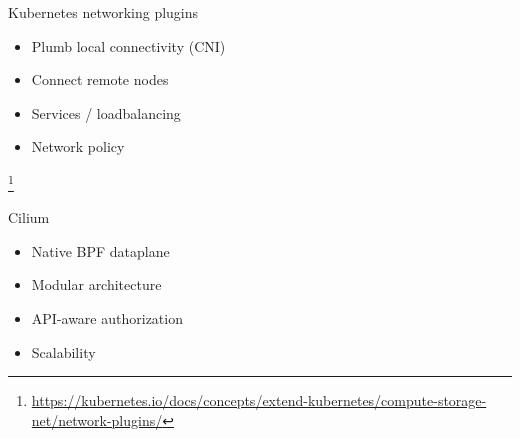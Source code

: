\documentclass[black,white]{beamer}
\newcommand\blfootnote[1]{%
  \begingroup
  \renewcommand\thefootnote{}\footnote{#1}%
  \addtocounter{footnote}{-1}%
  \endgroup
}
\DeclareRobustCommand{\#}{\adjustbox{valign=B,totalheight=.57\baselineskip}{\oldhash}}%
\begin{document}
    \begin{frame}{Kubernetes networking plugins}
        \begin{table}
            \begin{subtable}[l]{0.6\textwidth}
                \begin{itemize}
                    \item Plumb local connectivity (CNI) \medskip
                    \item Connect remote nodes \medskip
                    \item Services / loadbalancing \medskip
                    \item Network policy \medskip
                \end{itemize}
            \end{subtable}
            \begin{subtable}[r]{0.35\textwidth}
                \begin{figure}
                    
                \end{figure}
            \end{subtable}
        \end{table}
        \blfootnote{{\tiny \url{https://kubernetes.io/docs/concepts/extend-kubernetes/compute-storage-net/network-plugins/}}}
    \end{frame}

    \begin{frame}{Cilium}
        \begin{table}
            \begin{subtable}[l]{0.45\textwidth}
                \begin{itemize}
                    \item Native BPF dataplane \medskip
                    \item Modular architecture \medskip
                    \item API-aware authorization \medskip
                    \item Scalability \medskip
                \end{itemize}
            \end{subtable}
            \begin{subtable}[r]{0.5\textwidth}
                \begin{figure}
                    
                \end{figure}
            \end{subtable}
        \end{table}
    \end{frame}
\end{document}
